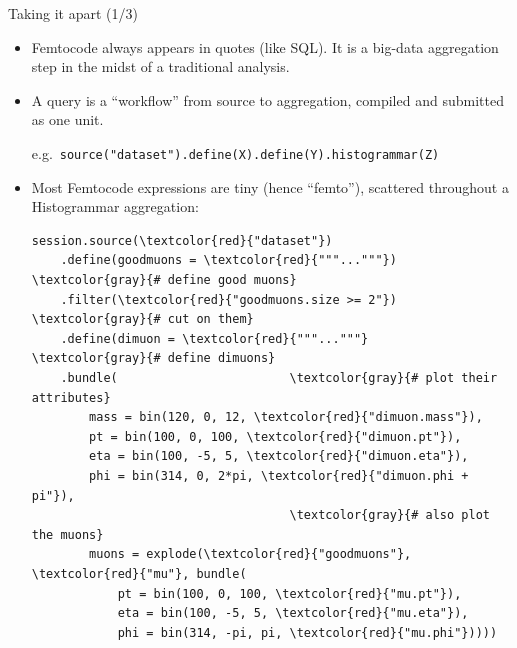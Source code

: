 \documentclass{beamer}
\begin{document}
\begin{frame}[fragile]{Taking it apart (1/3)}
\vspace{0.25 cm}
\begin{itemize}
\item Femtocode always appears in quotes (like SQL). It is a big-data aggregation step in the midst of a traditional analysis.

\item A query is a ``workflow'' from source to aggregation, compiled and submitted as one unit.

e.g.\ {\tt\scriptsize source("dataset").define(X).define(Y).histogrammar(Z) }

\item Most Femtocode expressions are tiny (hence ``femto''), scattered throughout a Histogrammar aggregation:

\scriptsize
\begin{Verbatim}[commandchars=\\\{\}]
session.source(\textcolor{red}{"dataset"})
    .define(goodmuons = \textcolor{red}{"""..."""})  \textcolor{gray}{# define good muons}
    .filter(\textcolor{red}{"goodmuons.size >= 2"})  \textcolor{gray}{# cut on them}
    .define(dimuon = \textcolor{red}{"""..."""}      \textcolor{gray}{# define dimuons}
    .bundle(                        \textcolor{gray}{# plot their attributes}
        mass = bin(120, 0, 12, \textcolor{red}{"dimuon.mass"}),
        pt = bin(100, 0, 100, \textcolor{red}{"dimuon.pt"}),
        eta = bin(100, -5, 5, \textcolor{red}{"dimuon.eta"}),
        phi = bin(314, 0, 2*pi, \textcolor{red}{"dimuon.phi + pi"}),
                                    \textcolor{gray}{# also plot the muons}
        muons = explode(\textcolor{red}{"goodmuons"}, \textcolor{red}{"mu"}, bundle(
            pt = bin(100, 0, 100, \textcolor{red}{"mu.pt"}),
            eta = bin(100, -5, 5, \textcolor{red}{"mu.eta"}),
            phi = bin(314, -pi, pi, \textcolor{red}{"mu.phi"}))))
\end{Verbatim}
\end{itemize}
\end{frame}
\end{document}

